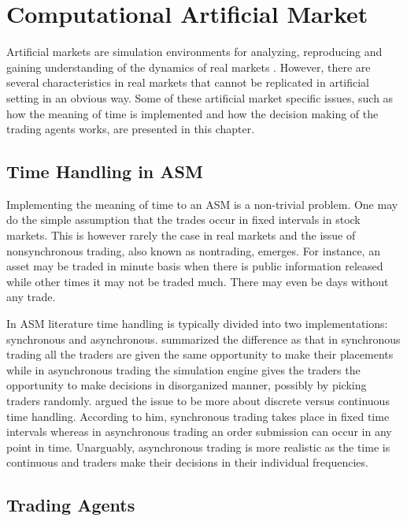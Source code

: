 \section{Computational Artificial Market}
Artificial markets are simulation environments for analyzing, 
reproducing and gaining understanding of the dynamics of 
real markets \citet{Julien07}. However, there are several 
characteristics in real markets that cannot be replicated
in artificial setting in an obvious way. Some of these artificial
market specific issues, such as how the meaning of time is 
implemented and how the decision making of the trading agents
works, are presented in this chapter.


\subsection{Time Handling in ASM}

Implementing the meaning of time to an ASM is a non-trivial problem.
One may do the simple assumption that the trades occur in fixed
intervals in stock markets. This is however rarely the case in real markets
and the issue of nonsynchronous trading, also known as nontrading, emerges. 
For instance, an asset may be traded in minute basis when there is
public information released while other times it may not be traded much.
There may even be days without any trade. \citep{Econometrics} 

In ASM literature time handling is typically divided into two implementations:
synchronous and asynchronous. \citet{Julien07} summarized the difference as that in synchronous
trading all the traders are given the same opportunity to make their placements
while in asynchronous trading the simulation engine gives the traders the opportunity to
make decisions in disorganized manner, possibly by picking traders randomly.
\citet{Ben17} argued the issue to be more about discrete versus continuous time handling.
According to him, synchronous trading takes place in fixed time intervals whereas in 
asynchronous trading an order submission can occur in any point in time. Unarguably, 
asynchronous trading is more realistic as the time is continuous and traders make
their decisions in their individual frequencies.


\subsection{Trading Agents}

